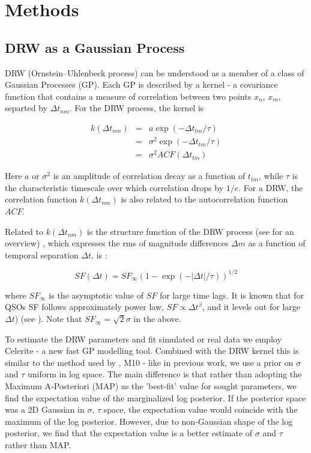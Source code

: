 \documentclass[twocolumn]{aastex62}
\begin{document}
\section{Methods}\label{sec:methods}
\subsection{DRW as a Gaussian Process}
DRW (Ornstein–Uhlenbeck process) can be understood as a member of a class of Gaussian Processes (GP). Each GP is described by a kernel - a covariance function that contains a measure of correlation between two points $x_{n}$, $x_{m}$, separted by $\Delta t_{nm}$. For the  DRW process, the kernel is 

\begin{eqnarray}
k(\Delta t_{nm}) &=& a \exp{(-\Delta t_{tm} / \tau)} \\
                 &=& \sigma^{2}\exp{(-\Delta t_{tm} / \tau)}  \\
                 &=& \sigma^{2} ACF(\Delta t_{tm})
\end{eqnarray} 

Here $a$ or $\sigma^{2}$ is an amplitude of correlation decay as a function of $t_{tm}$,  while $\tau$ is the characteristic timescale over which correlation drops by $1/e$. For a DRW,  the correlation function $k(\Delta t_{nm})$ is also related to the autocorrelation function $ACF$. 

Related to $k(\Delta t_{nm})$ is the   structure function of the DRW process (see \citet{macleod2012, bauer2009, graham2015a} for an overview) , which expresses the rms of  magnitude differences $\Delta m$ as a function of temporal separation $\Delta t$, is : 

\begin{equation}
SF(\Delta t) = SF_{\infty} (1-\exp{(-|\Delta t|/\tau)})^{1/2}
\end{equation}

where $SF_{\infty}$ is the asymptotic value of $SF$ for large time lags. It is known that for QSOs SF follows approximately power law, $SF \propto \Delta t^{\beta}$,  and it levels out for large $\Delta t$) (see \citet{macleod2012}).  Note that $SF_\infty = \sqrt{2} \sigma$  in the above. 


To estimate the  DRW  parameters and fit simulated or real data we employ Celerite - a new fast GP modelling tool\citep{foreman2017}. Combined with the DRW kernel this is similar to the method used by \citet{rybicki1992, kozlowski2010}, M10 - like in previous work, we use a  prior on $\sigma$ and $\tau$ uniform in log space.  The main difference is that rather than adopting the Maximum A-Posteriori (MAP) as the 'best-fit' value for sought parameters,  we find the expectation value of the marginalized log posterior. If the posterior space was a 2D Gaussian in $\sigma$, $\tau$ space, the expectation value would coincide with the maximum of the log posterior. However, due to non-Gaussian shape of the log posterior, we find that the expectation value is a better   estimate of $\sigma$ and $\tau$  rather than MAP. 
\end{document}
